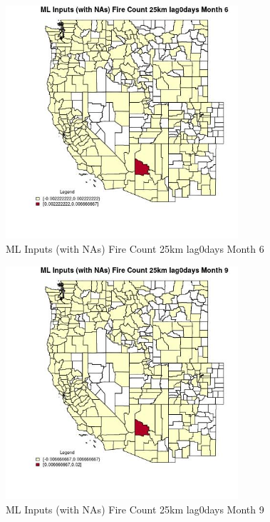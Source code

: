 \begin{figure} 
\centering  
\includegraphics[width=0.77\textwidth]{Code_Outputs/Report_ML_input_PM25_Step4_part_e_de_duplicated_aves_compiled_2019-05-21wNAs_CountyFire_Count_25km_lag0daysmedianMonth6.jpg} 
\caption{\label{fig:Report_ML_input_PM25_Step4_part_e_de_duplicated_aves_compiled_2019-05-21wNAsCountyFire_Count_25km_lag0daysmedianMonth6}ML Inputs (with NAs) Fire Count 25km lag0days Month 6} 
\end{figure} 
 

\begin{figure} 
\centering  
\includegraphics[width=0.77\textwidth]{Code_Outputs/Report_ML_input_PM25_Step4_part_e_de_duplicated_aves_compiled_2019-05-21wNAs_CountyFire_Count_25km_lag0daysmedianMonth9.jpg} 
\caption{\label{fig:Report_ML_input_PM25_Step4_part_e_de_duplicated_aves_compiled_2019-05-21wNAsCountyFire_Count_25km_lag0daysmedianMonth9}ML Inputs (with NAs) Fire Count 25km lag0days Month 9} 
\end{figure} 
 


